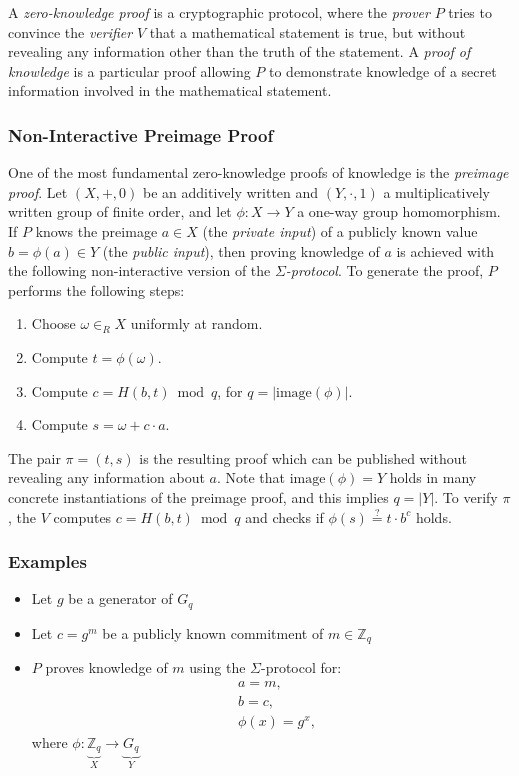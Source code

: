 \documentclass[bibtotoc,halfparskip,oneside]{scrreprt}
\begin{document}
A \emph{zero-knowledge proof} is a cryptographic protocol, where the \emph{prover} $P$ tries to convince the \emph{verifier} $V$ that a mathematical statement is true, but without revealing any  information other than the truth of the statement. A \emph{proof of knowledge} is a particular proof allowing $P$ to demonstrate knowledge of a secret information involved in the mathematical statement.

\subsubsection{Non-Interactive Preimage Proof}

One of the most fundamental zero-knowledge proofs of knowledge is the \emph{preimage proof}. Let $(X,+,0)$ be an additively written and $(Y,\cdot,1)$ a multiplicatively written group of finite order, and let $\phi:X\rightarrow Y$ a one-way group homomorphism. If $P$ knows the preimage $a\in X$ (the \emph{private input}) of a publicly known value $b=\phi(a)\in Y$ (the \emph{public input}), then proving knowledge of $a$ is achieved with the following non-interactive version of the \emph{$\Sigma$-protocol}. To generate the proof, $P$ performs the following steps:
\begin{enumerate}
	\item Choose $\omega\in_R X$ uniformly at random.
	\item Compute $t=\phi(\omega)$.
	\item Compute $c = H(b,t) \bmod{q}$, for $q=|\text{image}(\phi)|$.
	\item Compute $s = \omega + c\cdot a$.
\end{enumerate}
The pair $\pi=(t,s)$ is the resulting proof which can be published without revealing any information about $a$. Note that $\text{image}(\phi)=Y$ holds in many concrete instantiations of the  preimage proof, and this implies $q=|Y|$. To verify $\pi$, the $V$ computes $c = H(b,t) \bmod{q}$ and checks if $\phi(s)\stackrel{?}{=}t\cdot b^c$ holds.

\subsubsection{Examples}

	\begin{itemize}
		\item Let $g$ be a generator of $G_q$
		\item Let $c=g^m $ be a publicly known commitment of $m\in\mathbb{Z}_q$ 
		\item $P$ proves knowledge of $m$ using the $\Sigma$-protocol for:
		\begin{align*}
			 &a = m,\\
			 &b = c,\\
			 &\phi(x)=g^x,
		\end{align*}
		where $\phi:\underbrace{\mathbb{Z}_q}_X\rightarrow \underbrace{G_q}_Y$
	\end{itemize}
\end{document}
